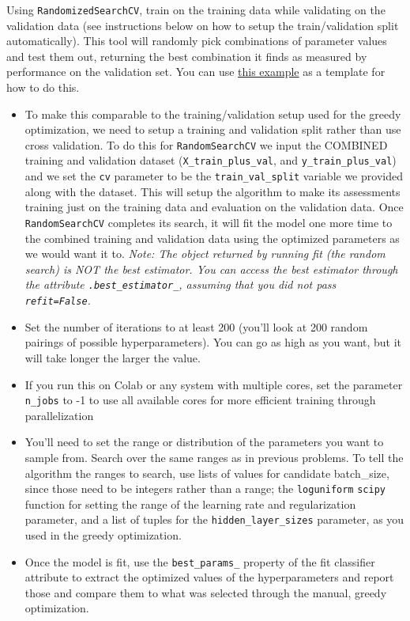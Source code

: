 \documentclass[
  letterpaper,
  DIV=11,
  numbers=noendperiod]{scrartcl}
\providecommand{\tightlist}{%
  \setlength{\itemsep}{0pt}\setlength{\parskip}{0pt}}\usepackage{longtable,booktabs,array}
\begin{document}
Using \texttt{RandomizedSearchCV}, train on the training data while
validating on the validation data (see instructions below on how to
setup the train/validation split automatically). This tool will randomly
pick combinations of parameter values and test them out, returning the
best combination it finds as measured by performance on the validation
set. You can use
\href{https://scikit-learn.org/stable/auto_examples/model_selection/plot_randomized_search.html\#sphx-glr-auto-examples-model-selection-plot-randomized-search-py}{this
example} as a template for how to do this.

\begin{itemize}
\tightlist
\item
  To make this comparable to the training/validation setup used for the
  greedy optimization, we need to setup a training and validation split
  rather than use cross validation. To do this for
  \texttt{RandomSearchCV} we input the COMBINED training and validation
  dataset (\texttt{X\_train\_plus\_val}, and
  \texttt{y\_train\_plus\_val}) and we set the \texttt{cv} parameter to
  be the \texttt{train\_val\_split} variable we provided along with the
  dataset. This will setup the algorithm to make its assessments
  training just on the training data and evaluation on the validation
  data. Once \texttt{RandomSearchCV} completes its search, it will fit
  the model one more time to the combined training and validation data
  using the optimized parameters as we would want it to. \emph{Note: The
  object returned by running fit (the random search) is NOT the best
  estimator. You can access the best estimator through the attribute
  \texttt{.best\_estimator\_}, assuming that you did not pass
  \texttt{refit=False}.}
\item
  Set the number of iterations to at least 200 (you'll look at 200
  random pairings of possible hyperparameters). You can go as high as
  you want, but it will take longer the larger the value.
\item
  If you run this on Colab or any system with multiple cores, set the
  parameter \texttt{n\_jobs} to -1 to use all available cores for more
  efficient training through parallelization
\item
  You'll need to set the range or distribution of the parameters you
  want to sample from. Search over the same ranges as in previous
  problems. To tell the algorithm the ranges to search, use lists of
  values for candidate batch\_size, since those need to be integers
  rather than a range; the \texttt{loguniform} \texttt{scipy} function
  for setting the range of the learning rate and regularization
  parameter, and a list of tuples for the \texttt{hidden\_layer\_sizes}
  parameter, as you used in the greedy optimization.
\item
  Once the model is fit, use the \texttt{best\_params\_} property of the
  fit classifier attribute to extract the optimized values of the
  hyperparameters and report those and compare them to what was selected
  through the manual, greedy optimization.
\end{itemize}
\end{document}
